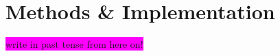 \documentclass[aps,pra,english,notitlepage,reprint,nofootinbib]{revtex4-1}  %
\begin{document}


\section{Methods \& Implementation}\label{sec:methods}
\colorbox{magenta}{write in past tense from here on!}


\end{document}

